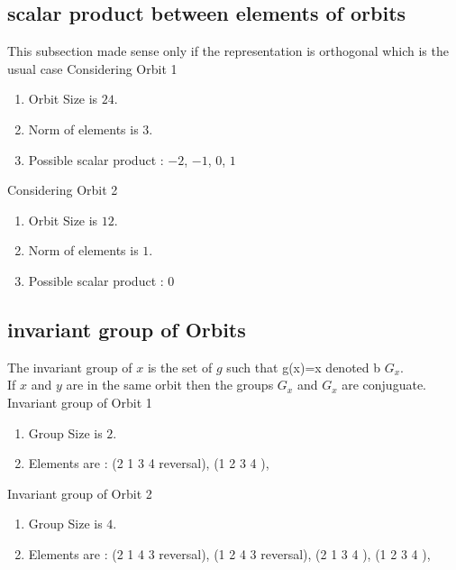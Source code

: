 \documentclass[12pt]{article}
\begin{document}
\subsection{scalar product between elements of orbits}
\noindent This subsection made sense only if the representation is orthogonal which is the usual case
Considering Orbit 1
\begin{enumerate}
\item Orbit Size is $24$.
\item Norm of elements is $3$.
\item Possible scalar product : $-2$, $-1$, $0$, $1$
\end{enumerate}
Considering Orbit 2
\begin{enumerate}
\item Orbit Size is $12$.
\item Norm of elements is $1$.
\item Possible scalar product : $0$
\end{enumerate}
\subsection{invariant group of Orbits}
\noindent The invariant group of $x$ is the set of $g$ such that g(x)=x denoted b $G_x$.\\
If $x$ and $y$ are in the same orbit then the groups $G_x$ and  $G_x$ are conjuguate.\\
Invariant group of Orbit 1
\begin{enumerate}
\item Group Size is $2$.
\item Elements are : (2 1 3 4   reversal), (1 2 3 4  ), 
\end{enumerate}
Invariant group of Orbit 2
\begin{enumerate}
\item Group Size is $4$.
\item Elements are : (2 1 4 3   reversal), (1 2 4 3   reversal), (2 1 3 4  ), (1 2 3 4  ), 
\end{enumerate}
\end{document}
